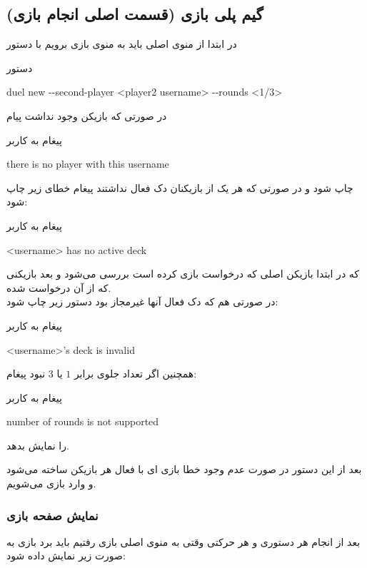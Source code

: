 \documentclass[]{article}
\begin{document}
\subsection*{{\titr گیم پلی بازی (قسمت اصلی انجام بازی)}}
در ابتدا از منوی اصلی باید به منوی بازی برویم با دستور
\begin{mybox}[colback=yellow]{دستور}
	\begin{latin}	
		duel new -{}-second-player <player2 username> -{}-rounds <1/3>
	\end{latin}
\end{mybox}
    در صورتی که بازیکن  وجود نداشت پیام
\begin{mybox}[colback=yellow]{پیغام به کاربر}
	\begin{latin}	
		there is no player with this username
	\end{latin}
\end{mybox}
    چاپ شود و در صورتی که هر یک از بازیکنان دک فعال نداشتند پیغام خطای زیر 
    چاپ شود:
\begin{mybox}[colback=yellow]{پیغام به کاربر}
	\begin{latin}	
		<username> has no active deck
	\end{latin}
\end{mybox}
    که در ابتدا بازیکن اصلی که درخواست بازی کرده است بررسی می‌شود و بعد 
    بازیکنی که از آن درخواست شده.
\\
    در صورتی هم که دک فعال آنها غیرمجاز بود دستور زیر چاپ شود:
\begin{mybox}[colback=yellow]{پیغام به کاربر}
	\begin{latin}	
		<username>’s deck is invalid
	\end{latin}
\end{mybox}
همچنین اگر تعداد جلوی 
برابر $1$ یا $3$ نبود پیغام:

\begin{mybox}[colback=yellow]{پیغام به کاربر}
	\begin{latin}	
		number of rounds is not supported
	\end{latin}
\end{mybox}
را نمایش بدهد.

    بعد از این دستور در صورت عدم وجود خطا بازی ای با  فعال هر 
    بازیکن ساخته می‌شود و وارد بازی می‌شویم.
\subsubsection*{{\titr نمایش صفحه بازی}}
بعد از انجام هر دستوری و هر حرکتی وقتی به منوی اصلی بازی رفتیم باید برد 
بازی به صورت زیر نمایش داده شود:
\end{document}
